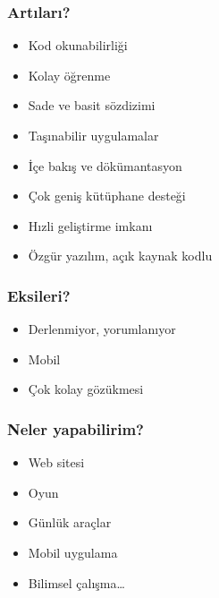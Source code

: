 \documentclass[10pt, compress]{beamer}
\begin{document}

\begin{frame}[fragile]
    \frametitle{Artıları?}
    \begin{itemize}[<+- | alert@+>]
        \item Kod okunabilirliği
        \item Kolay öğrenme
        \item Sade ve basit sözdizimi
        \item Taşınabilir uygulamalar
        \item İçe bakış ve dökümantasyon
        \item Çok geniş kütüphane desteği
        \item Hızli geliştirme imkanı
        \item Özgür yazılım, açık kaynak kodlu
    \end{itemize}  
\end{frame}


\begin{frame}[fragile]
    \frametitle{Eksileri?}
    \begin{itemize}[<+- | alert@+>]
        \item Derlenmiyor, yorumlanıyor
        \item Mobil
        \item Çok kolay gözükmesi
    \end{itemize}  
\end{frame}


\begin{frame}[fragile]
    \frametitle{Neler yapabilirim?}
    \begin{itemize}[<+- | alert@+>]
        \item Web sitesi
        \item Oyun
        \item Günlük araçlar
        \item Mobil uygulama
        \item Bilimsel çalışma\ldots 
    \end{itemize}  
\end{frame}
\end{document}
